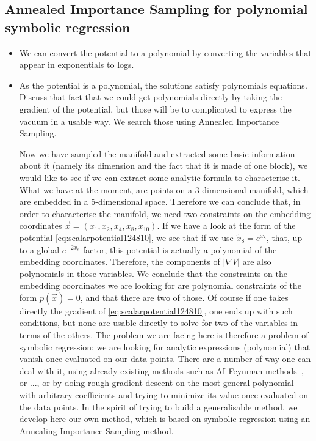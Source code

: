 \documentclass[11pt]{article}
\begin{document}
	\subsection{Annealed Importance Sampling for polynomial symbolic regression}
	\begin{itemize}[label=\textbullet]
		\item We can convert the potential to a polynomial by converting the variables that appear in exponentials to logs.
		\item As the potential is a polynomial, the solutions satisfy polynomials equations. Discuss that fact that we could get polynomials directly by taking the gradient of the potential, but those will be to complicated to express the vacuum in a usable way.  We search those using Annealed Importance Sampling.
		
		Now we have sampled the manifold and extracted some basic information about it (namely its dimension and the fact that it is made of one block), we would like to see if we can extract some analytic formula to characterise it. What we have at the moment, are points on a 3-dimensional manifold, which are embedded in a 5-dimensional space. Therefore we can conclude that, in order to characterise the manifold, we need two constraints on the embedding coordinates $\vec{x} = (x_1,x_2,x_4,x_8,x_{10})$. If we have a look at the form of the potential \eqref{eq:scalarpotential124810}, we see that if we use $\tilde{x}_{8} = e^{x_8}$, that, up to a global $e^{-2x_8}$ factor, this potential is actually a polynomial of the embedding coordinates. Therefore, the components of $|\nabla V|$ are also polynomials in those variables. We conclude that the constraints on the embedding coordinates we are looking for are polynomial constraints of the form $p(\vec{x}) = 0$, and that there are two of those. Of course if one takes directly the gradient of \eqref{eq:scalarpotential124810}, one ends up with such conditions, but none are usable directly to solve for two of the variables in terms of the others. The problem we are facing here is therefore a problem of symbolic regression: we are looking for analytic expressions (polynomial) that vanish once evaluated on our data points. There are a number of way one can deal with it, using already existing methods such as AI Feynman methods~\cite{Udrescu:2019mnk}, or ..., or by doing rough gradient descent on the most general polynomial with arbitrary coefficients and trying to minimize its value once evaluated on the data points. In the spirit of trying to build a generalisable method, we develop here our own method, which is based on symbolic regression using an Annealing Importance Sampling method. 


\end{itemize}
\end{document}
